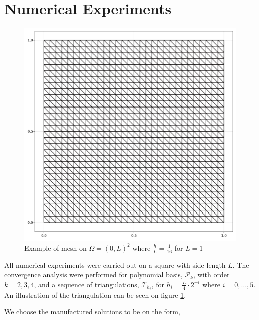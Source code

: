 


\newpage
\section{Numerical Experiments}%
\label{sub:manufactured_solution}

\begin{figure}[h!]
    \centering
    \includegraphics[width=0.4 \textwidth]{figures/model/l_1.0_m_1_r_1n_30_grid.png}
    \caption{Example of mesh on $ \Omega =  \left( 0,L  \right)^{2}$ where $\frac{h}{L}=\frac{1}{16}$ for $L=1$   }
    \label{fig:sol_l1_m1_r1}
\end{figure}
All numerical experiments were carried out on a square with side length $L$. The convergence analysis were performed for polynomial basis, $\mathcal{P}_{k} $, with order $k=2,3,4$, and a sequence of triangulations, $\mathcal{T} _{h_i}$, for $h_i =
\frac{L}{4}\cdot 2^{-i}$ where $ i =0,\ldots,5 $.
An illustration of the triangulation can be seen on figure \ref{fig:sol_l1_m1_r1}.

We choose the manufactured solutions to be on the form,

